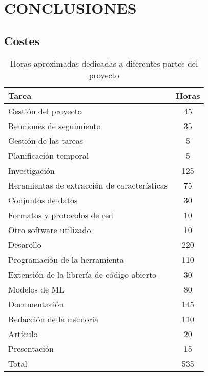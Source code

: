 \newpage
\pagestyle{plain}

\chapter{CONCLUSIONES}

\section{Costes}

\begin{table}[H]
  \centering
  \begin{tabular}{|l | c |}
      \hline
      \textbf{Tarea}                                & \textbf{Horas}       \\  
      \hline
      \rowcolor{lightgray} Gestión del proyecto     &  45                  \\
      Reuniones de seguimiento                      &  35                  \\
      Gestión de las tareas                         &   5                  \\
      Planificación temporal                        &   5                  \\  
      \hline
      \rowcolor{lightgray} Investigación            & 125                  \\
      Heramientas de extracción de características  &  75                  \\
      Conjuntos de datos                            &  30                  \\
      Formatos y protocolos de red                  &  10                  \\
      Otro software utilizado                       &  10                  \\
      \hline
      \rowcolor{lightgray} Desarollo                & 220                  \\
      Programación de la herramienta                & 110                  \\
      Extensión de la librería de código abierto    &  30                  \\
      Modelos de ML                                 &  80                  \\
      \hline
      \rowcolor{lightgray} Documentación            & 145                  \\
      Redacción de la memoria                       & 110                  \\
      Artículo                                      &  20                  \\
      Presentación                                  &  15                  \\
      \hline
      \rowcolor{lightgray} Total                    & 535                  \\
      \hline
  \end{tabular}
  \caption{Horas aproximadas dedicadas a diferentes partes del proyecto}
  \label{table:horasdedicadas}
\end{table}

